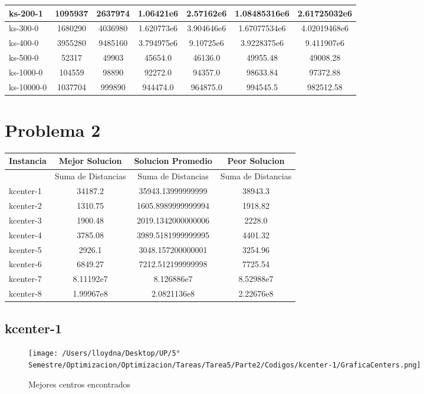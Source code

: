 \documentclass{report}
\begin{document}
\begin{tabular}{l|c|c|c|c|c|c}
        \hline
        ks-200-1 & 1095937 & 2637974 & 1.06421e6 & 2.57162e6 & 1.08485316e6 & 2.61725032e6\\
        \hline
        ks-300-0 & 1680290 & 4036980 & 1.620773e6 & 3.904646e6 & 1.67077534e6 & 4.02019468e6\\
        \hline
        ks-400-0 & 3955280 & 9485160 & 3.794975e6 & 9.10725e6 & 3.9228375e6 & 9.411907e6\\
        \hline
        ks-500-0 & 52317 & 49903 & 45654.0 & 46136.0 & 49955.48 & 49008.28\\
        \hline
        ks-1000-0 & 104559 & 98890 & 92272.0 & 94357.0 & 98633.84 & 97372.88\\
        \hline
        ks-10000-0 & 1037704 & 999890 & 944474.0 & 964875.0 & 994545.5 & 982512.58               
        
    \end{tabular}

    \chapter{Problema 2}

    \begin{tabular}{l|c|c|c}
        Instancia & Mejor Solucion & Solucion Promedio & Peor Solucion\\
        \hline
        & Suma de Distancias & Suma de Distancias & Suma de Distancias\\
        \hline
        kcenter-1 & 34187.2 & 35943.13999999999 & 38943.3\\
        \hline
        kcenter-2 & 1310.75 & 1605.8989999999994 & 1918.82\\
        \hline
        kcenter-3 & 1900.48 & 2019.1342000000006 & 2228.0\\
        \hline
        kcenter-4 & 3785.08 & 3989.5181999999995 & 4401.32\\
        \hline
        kcenter-5 & 2926.1 & 3048.157200000001 & 3254.96\\
        \hline
        kcenter-6 & 6849.27 & 7212.512199999998 & 7725.54\\
        \hline
        kcenter-7 & 8.11192e7 & 8.126886e7 & 8.52988e7\\
        \hline
        kcenter-8 & 1.99967e8 & 2.0821136e8 & 2.22676e8\\
            
    \end{tabular}
    \pagebreak

    \section{kcenter-1}
        \begin{figure}[H]
            \texttt{[image: /Users/lloydna/Desktop/UP/5° Semestre/Optimizacion/Optimizacion/Tareas/Tarea5/Parte2/Codigos/kcenter-1/GraficaCenters.png]}
            \caption{Mejores centros encontrados}
            \label{fig:kc11}
        \end{figure}
\end{document}
